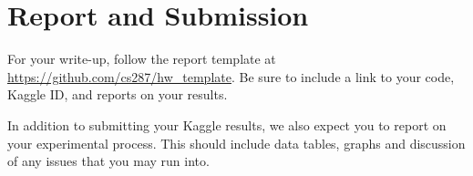 \documentclass[11pt]{article}
\begin{document}
\section{Report and Submission}

For your write-up, follow the report template at
\url{https://github.com/cs287/hw_template}. Be sure to include a link
to your code, Kaggle ID, and reports on your results.

In addition to submitting your Kaggle results, we also expect you to report on your 
experimental process. This should include data tables, graphs and discussion of any 
issues that you may run into. 

 

\end{document}
